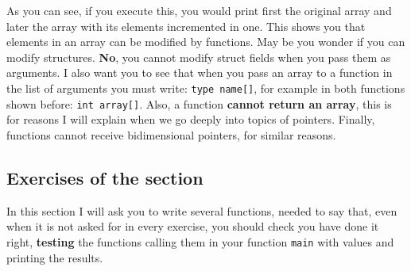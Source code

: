 \documentclass[a4paper]{article}
\begin{document}
As you can see, if you execute this, you would print first the original array
and later the array with its elements incremented in one. This shows you that
elements in an array can be modified by functions. May be you wonder if you can
modify structures. \textbf{No}, you cannot modify struct fields when you pass
them as arguments. I also want you to see that when you pass an array to a
function in the list of arguments you must write: \verb!type name[]!, for
example in both functions shown before: \verb!int array[]!. Also, a function
\textbf{cannot return an array}, this is for reasons I will explain when we go
deeply into topics of pointers. Finally, functions cannot receive bidimensional
pointers, for similar reasons.


\subsection{Exercises of the section}
In this section I will ask you to write several functions, needed to say that,
even when it is not asked for in every exercise, you should check
you have done it right, \textbf{testing} the functions calling them in your
function \verb!main! with values and printing the results.
\end{document}

